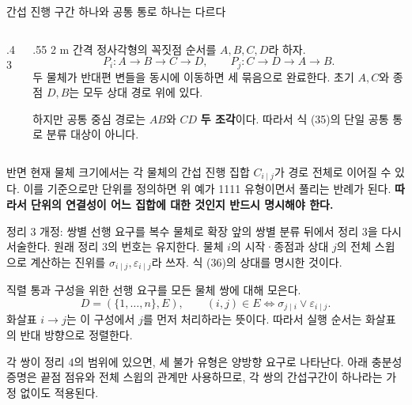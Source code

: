\begin{frame}{간섭 진행 구간 하나와 공통 통로 하나는 다르다}
\begin{columns}[T]
\begin{column}{.43\textwidth}\centering
{}
\end{column}\begin{column}{.55\textwidth}\small
2 m 간격 정사각형의 꼭짓점 순서를 $A,B,C,D$라 하자.
\[
 P_i:A\to B\to C\to D,\qquad
 P_j:C\to D\to A\to B.
\]
두 물체가 반대편 변들을 동시에 이동하면 세 묶음으로 완료한다.
초기 $A,C$와 종점 $D,B$는 모두 상대 경로 위에 있다.
\par\medskip
하지만 공통 중심 경로는 $AB$와 $CD$ \textbf{두 조각}이다.
따라서 식 (35)의 단일 공통 통로 분류 대상이 아니다.
\end{column}\end{columns}
\par\medskip\small
반면 현재 물체 크기에서는 각 물체의 간섭 진행 집합 $C_{i\mid j}$가 경로 전체로 이어질 수 있다.
이를 기준으로만 단위를 정의하면 위 예가 1111 유형이면서 풀리는 반례가 된다.
\textbf{따라서 단위의 연결성이 어느 집합에 대한 것인지 반드시 명시해야 한다.}
\end{frame}


\begin{frame}{정리 3 개정: 쌍별 선행 요구를 복수 물체로 확장}
\small
앞의 쌍별 분류 뒤에서 정리 3을 다시 서술한다. 원래 정리 3의 번호는 유지한다.
물체 $i$의 시작·종점과 상대 $j$의 전체 스윕으로 계산하는 진위를
$\sigma_{i\mid j},\varepsilon_{i\mid j}$라 쓰자. 식 (36)의 상대를 명시한 것이다.
\par\medskip
직렬 통과 구성을 위한 선행 요구를 모든 물체 쌍에 대해 모은다.
\begin{equation}
 D=(\{1,\ldots,n\},E),\qquad
 (i,j)\in E\iff\sigma_{j\mid i}\lor\varepsilon_{i\mid j}.
 \tag{41}
\end{equation}
화살표 $i\to j$는 이 구성에서 $j$를 먼저 처리하라는 뜻이다.
따라서 실행 순서는 화살표의 반대 방향으로 정렬한다.
\begin{center}\end{center}
\footnotesize 각 쌍이 정리 4의 범위에 있으면, 세 불가 유형은 양방향 요구로 나타난다.
아래 충분성 증명은 끝점 점유와 전체 스윕의 관계만 사용하므로,
각 쌍의 간섭구간이 하나라는 가정 없이도 적용된다.
\end{frame}

